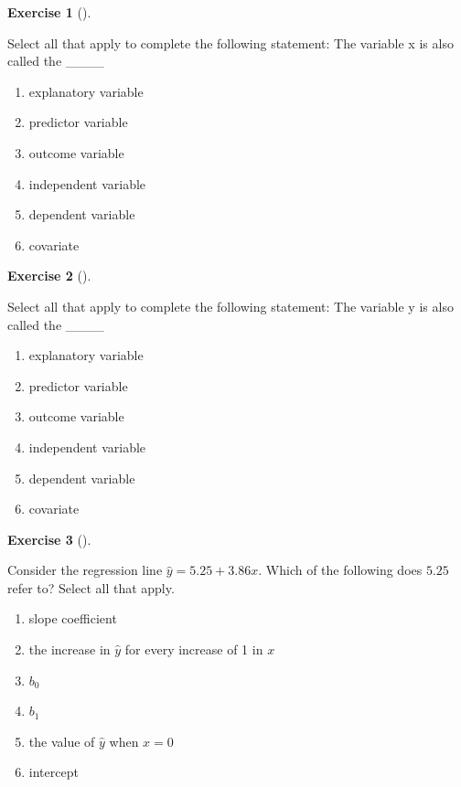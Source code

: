 \documentclass[
  letterpaper,
  DIV=11,
  numbers=noendperiod]{scrreprt}
\providecommand{\tightlist}{%
  \setlength{\itemsep}{0pt}\setlength{\parskip}{0pt}}\usepackage{longtable,booktabs,array}
\theoremstyle{definition}
\newtheorem{exercise}{Exercise}[chapter]
\theoremstyle{remark}
\begin{document}
\leavevmode{}%
\begin{exercise}[]\label{exr-ch05-c04}

Select all that apply to complete the following statement: The variable
x is also called the \_\_\_\_

\begin{enumerate}
\def\labelenumi{\alph{enumi})}
\tightlist
\item
  explanatory variable
\item
  predictor variable
\item
  outcome variable
\item
  independent variable
\item
  dependent variable
\item
  covariate
\end{enumerate}

\end{exercise}

\leavevmode{}%
\begin{exercise}[]\label{exr-ch05-c05}

Select all that apply to complete the following statement: The variable
y is also called the \_\_\_\_

\begin{enumerate}
\def\labelenumi{\alph{enumi})}
\tightlist
\item
  explanatory variable
\item
  predictor variable
\item
  outcome variable
\item
  independent variable
\item
  dependent variable
\item
  covariate
\end{enumerate}

\end{exercise}

\leavevmode{}%
\begin{exercise}[]\label{exr-ch05-c06}

Consider the regression line \(\hat{y}=5.25+3.86x\). Which of the
following does \(5.25\) refer to? Select all that apply.

\begin{enumerate}
\def\labelenumi{\alph{enumi})}
\tightlist
\item
  slope coefficient
\item
  the increase in \(\hat{y}\) for every increase of 1 in \(x\)
\item
  \(b_0\)
\item
  \(b_1\)
\item
  the value of \(\hat{y}\) when \(x=0\)
\item
  intercept
\end{enumerate}

\end{exercise}
\end{document}
